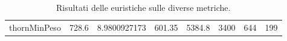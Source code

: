 \begin{sidewaystable}[]
\begin{tabular}{l|c|c|c|c|c|c|c}
thornMinPeso        & 728.6                & 8.9800927173                                                     & 601.35                                                                      & 5384.8                                                                     & 3400                                                                 & 644                                                                     & 199                                                                   
\end{tabular}
\caption{Risultati delle euristiche sulle diverse metriche.}
\label{tab:results}
\end{sidewaystable}